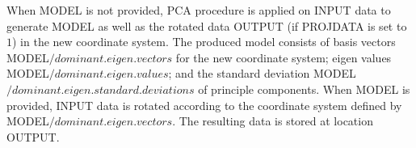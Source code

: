 \begin{comment}
\begin{table}
\parbox{.35\linewidth}{
\centering
\begin{tabular}{cc}
  \hline
  x & y \\
  \hline
  2.5 & 2.4  \\
  0.5 & 0.7  \\
  2.2 & 2.9  \\
  1.9 & 2.2  \\
  3.1 & 3.0  \\
  2.3 & 2.7  \\
  2 & 1.6  \\
  1 & 1.1  \\
  1.5 & 1.6  \\
  1.1 & 0.9  \\
	\hline
\end{tabular}
\caption{Input Data}
\label{tab:pca_data}
}
\hfill
\parbox{.55\linewidth}{
\centering
\begin{tabular}{cc}
  \hline
  x & y \\
  \hline
  .69  & .49  \\
  -1.31  & -1.21  \\
  .39  & .99  \\
  .09  & .29  \\
  1.29  & 1.09  \\
  .49  & .79  \\
  .19  & -.31  \\
  -.81  & -.81  \\
  -.31  & -.31  \\
  -.71  & -1.01  \\
  \hline
\end{tabular}
\caption{Data after centering and scaling}
\label{tab:pca_scaled_data}
}
\end{table}
\end{comment}

When MODEL is not provided, PCA procedure is applied on INPUT data to generate MODEL as well as the rotated data OUTPUT (if PROJDATA is set to $1$) in the new coordinate system. 
The produced model consists of basis vectors MODEL$/dominant.eigen.vectors$ for the new coordinate system; eigen values MODEL$/dominant.eigen.values$; and the standard deviation MODEL$/dominant.eigen.standard.deviations$ of principle components.
When MODEL is provided, INPUT data is rotated according to the coordinate system defined by MODEL$/dominant.eigen.vectors$. The resulting data is stored at location OUTPUT.
\\


